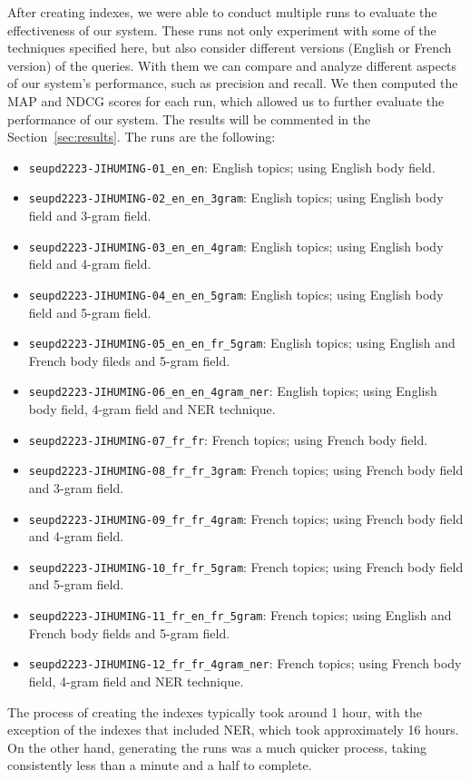 After creating indexes, we were able to conduct multiple runs to evaluate the effectiveness of our system.
These runs not only experiment with some of the techniques specified here, but also consider different versions (English
or French version) of the queries.
With them we can compare and analyze different aspects of our system's performance, such as precision and recall.
We then computed the MAP and NDCG scores for each run, which allowed us to further evaluate the performance of our 
system.
The results will be commented in the Section~\ref{sec:results}.
The runs are the following:
\begin{itemize}
	\item \texttt{seupd2223-JIHUMING-01\_en\_en}: English topics; using English body field.
	\item \texttt{seupd2223-JIHUMING-02\_en\_en\_3gram}: English topics; using English body field and 3-gram field.
	\item \texttt{seupd2223-JIHUMING-03\_en\_en\_4gram}: English topics; using English body field and 4-gram field.
	\item \texttt{seupd2223-JIHUMING-04\_en\_en\_5gram}: English topics; using English body field and 5-gram field.
	\item \texttt{seupd2223-JIHUMING-05\_en\_en\_fr\_5gram}: English topics; using English and French body fileds and 5-gram field.
	\item \texttt{seupd2223-JIHUMING-06\_en\_en\_4gram\_ner}: English topics; using English body field, 4-gram field and NER technique.
	\item \texttt{seupd2223-JIHUMING-07\_fr\_fr}: French topics; using French body field.
	\item \texttt{seupd2223-JIHUMING-08\_fr\_fr\_3gram}: French topics; using French body field and 3-gram field.
	\item \texttt{seupd2223-JIHUMING-09\_fr\_fr\_4gram}: French topics; using French body field and 4-gram field.
	\item \texttt{seupd2223-JIHUMING-10\_fr\_fr\_5gram}: French topics; using French body field and 5-gram field.
	\item \texttt{seupd2223-JIHUMING-11\_fr\_en\_fr\_5gram}: French topics; using English and French body fields and 5-gram field.
	\item \texttt{seupd2223-JIHUMING-12\_fr\_fr\_4gram\_ner}: French topics; using French body field, 4-gram field and NER technique.
\end{itemize}

The process of creating the indexes typically took around 1 hour, with the exception of the indexes that included NER,
which took approximately 16 hours.
On the other hand, generating the runs was a much quicker process, taking consistently less than a minute and a half to
complete.